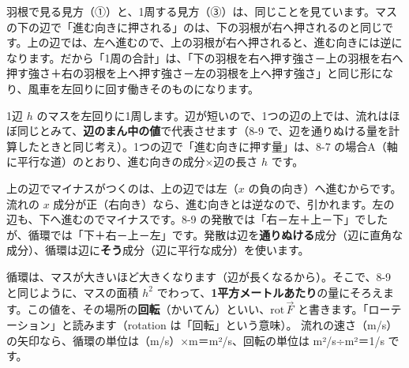 \begin{seikaku}
羽根で見る見方（①）と、1周する見方（③）は、同じことを見ています。マスの下の辺で「進む向きに押される」のは、下の羽根が右へ押されるのと同じです。上の辺では、左へ進むので、上の羽根が右へ押されると、進む向きには逆になります。だから「1周の合計」は、「下の羽根を右へ押す強さ－上の羽根を右へ押す強さ＋右の羽根を上へ押す強さ－左の羽根を上へ押す強さ」と同じ形になり、風車を左回りに回す働きそのものになります。
\end{seikaku}



\leavevmode\label{bk:8-10:masu}1辺 $h$ のマスを左回りに1周します。辺が短いので、1つの辺の上では、流れはほぼ同じとみて、\textbf{辺のまん中の値}で代表させます（8-9 で、辺を通りぬける量を計算したときと同じ考え）。1つの辺で「進む向きに押す量」は、8-7 の場合A（軸に平行な道）のとおり、進む向きの成分×辺の長さ $h$ です。

\begin{bkfigure}
\label{bk:8-10:fig-yonhen}
\end{bkfigure}
上の辺でマイナスがつくのは、上の辺では左（$x$ の負の向き）へ進むからです。流れの $x$ 成分が正（右向き）なら、進む向きとは逆なので、引かれます。左の辺も、下へ進むのでマイナスです。8-9 の発散では「右－左＋上－下」でしたが、循環では「下＋右－上－左」です。発散は辺を\textbf{通りぬける}成分（辺に直角な成分）、循環は辺に\textbf{そう}成分（辺に平行な成分）を使います。

循環は、マスが大きいほど大きくなります（辺が長くなるから）。そこで、8-9 と同じように、マスの面積 $h^2$ でわって、\textbf{1平方メートルあたり}の量にそろえます。この値を、その場所の\textbf{回転}（かいてん）といい、$\mathrm{rot}\,\vec F$ と書きます。「ローテーション」と読みます（rotation は「回転」という意味）。
流れの速さ（m/s）の矢印なら、循環の単位は（m/s）×m＝m²/s、回転の単位は m²/s÷m²＝1/s です。

